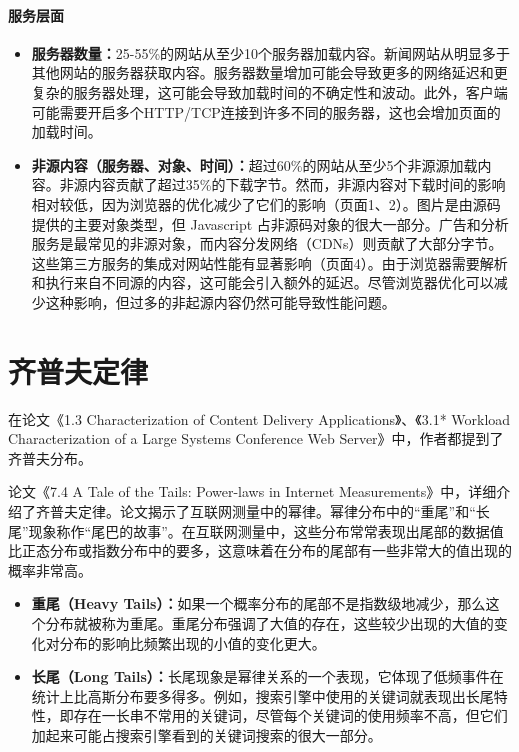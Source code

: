 \subsubsection{服务层面}
\begin{itemize}
	\item \textbf{服务器数量：}25-55\%的网站从至少10个服务器加载内容。新闻网站从明显多于其他网站的服务器获取内容。服务器数量增加可能会导致更多的网络延迟和更复杂的服务器处理，这可能会导致加载时间的不确定性和波动。此外，客户端可能需要开启多个HTTP/TCP连接到许多不同的服务器，这也会增加页面的加载时间。
	\item \textbf{非源内容（服务器、对象、时间）：}超过60\%的网站从至少5个非源源加载内容。非源内容贡献了超过35\%的下载字节。然而，非源内容对下载时间的影响相对较低，因为浏览器的优化减少了它们的影响（页面1、2）。图片是由源码提供的主要对象类型，但 Javascript 占非源码对象的很大一部分。广告和分析服务是最常见的非源对象，而内容分发网络（CDNs）则贡献了大部分字节。这些第三方服务的集成对网站性能有显著影响（页面4）。由于浏览器需要解析和执行来自不同源的内容，这可能会引入额外的延迟。尽管浏览器优化可以减少这种影响，但过多的非起源内容仍然可能导致性能问题。
\end{itemize}




\chapter{齐普夫定律}
在论文《1.3 Characterization of Content Delivery Applications》、《3.1* Workload Characterization of a Large Systems Conference Web Server》中，作者都提到了齐普夫分布。

论文《7.4 A Tale of the Tails: Power-laws in Internet Measurements》中，详细介绍了齐普夫定律。论文揭示了互联网测量中的幂律。幂律分布中的“重尾”和“长尾”现象称作“尾巴的故事”。在互联网测量中，这些分布常常表现出尾部的数据值比正态分布或指数分布中的要多，这意味着在分布的尾部有一些非常大的值出现的概率非常高。

\begin{itemize}
	\item \textbf{重尾（Heavy Tails）：}如果一个概率分布的尾部不是指数级地减少，那么这个分布就被称为重尾。重尾分布强调了大值的存在，这些较少出现的大值的变化对分布的影响比频繁出现的小值的变化更大。

	\item \textbf{长尾（Long Tails）：}长尾现象是幂律关系的一个表现，它体现了低频事件在统计上比高斯分布要多得多。例如，搜索引擎中使用的关键词就表现出长尾特性，即存在一长串不常用的关键词，尽管每个关键词的使用频率不高，但它们加起来可能占搜索引擎看到的关键词搜索的很大一部分。
\end{itemize}

